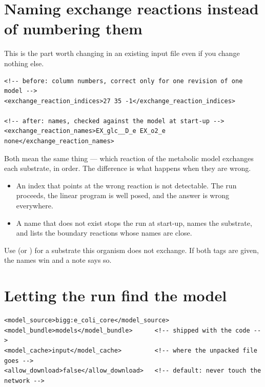 \section{Naming exchange reactions instead of numbering them}

This is the part worth changing in an existing input file even if you change
nothing else.

\begin{lstlisting}[style=xml]
<!-- before: column numbers, correct only for one revision of one model -->
<exchange_reaction_indices>27 35 -1</exchange_reaction_indices>

<!-- after: names, checked against the model at start-up -->
<exchange_reaction_names>EX_glc__D_e EX_o2_e none</exchange_reaction_names>
\end{lstlisting}

Both mean the same thing --- which reaction of the metabolic model exchanges
each substrate, in  order. The difference is what
happens when they are wrong.

\begin{itemize}[leftmargin=1.4em]
\item An index that points at the wrong reaction is not detectable. The run
      proceeds, the linear program is well posed, and the answer is wrong
      everywhere.
\item A name that does not exist stops the run at start-up, names the
      substrate, and lists the boundary reactions whose names are close.
\end{itemize}

Use  (or ) for a substrate this organism does not exchange.
If both tags are given, the names win and a note says so.


\section{Letting the run find the model}

\begin{lstlisting}[style=xml]
<model_source>bigg:e_coli_core</model_source>
<model_bundle>models</model_bundle>      <!-- shipped with the code -->
<model_cache>input</model_cache>         <!-- where the unpacked file goes -->
<allow_download>false</allow_download>   <!-- default: never touch the network -->
\end{lstlisting}

